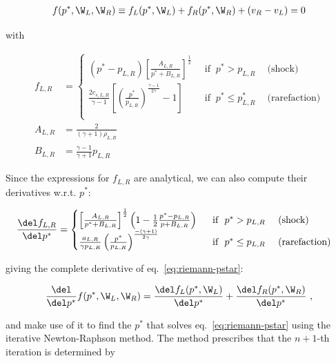 \begin{align}
	f(p^*, \W_L, \W_R) \equiv f_L(p^*, \W_L) + f_R(p^*, \W_R) + (v_R - v_L) = 0
\label{eq:riemann-pressure-equation}
\end{align}

with

\begin{align}
	f_{L,R} &=
		\begin{cases}
			(p^* - p_{L,R}) \left[ \frac{A_{L,R}}{p^* + B_{L,R}} \right]^{\frac{1}{2}}
				& ~\text{ if } ~ p^* > p_{L,R} ~ \quad \text{(shock)} \\
			\frac{2 c_{s,L,R}}{\gamma - 1} \left[ \left( \frac{p^*}{p_{L,R}} \right)^ \frac{\gamma
-1}{2 \gamma} - 1 \right]
				& ~\text{ if } ~ p^* \leq p^*_{L,R} ~ \quad \text{(rarefaction)}
\label{eq:riemann-pstar}\\
		\end{cases} \\
	A_{L,R} &=
		\frac{2}{(\gamma + 1) \rho_{L,R}}\\
	B_{L,R} &=
		\frac{\gamma - 1}{\gamma + 1} p_{L,R}
\end{align}


Since the expressions for $f_{L,R}$ are analytical, we can also compute their derivatives w.r.t.
$p^*$:

\begin{align}
	\frac{\del f_{L,R}}{\del p^*} &=
		\begin{cases}
			\left[
                \frac{A_{L,R}}{p^* + B_{L,R}}
            \right]^{\frac{1}{2}} \left( 1 - \frac{1}{2}
            \frac{p^* - p_{L,R}}{p + B_{L,R}} \right)
				& ~\text{ if } ~ p^* > p_{L,R} ~ \quad \text{(shock)} \\
			\frac{a_{L,R}}{\gamma p_{L,R}}
			\left( \frac{p^*}{p_{L,R}} \right)^ \frac{-(\gamma+1)}{2 \gamma}
				& ~\text{ if } ~ p^* \leq p_{L,R} ~ \quad \text{(rarefaction)}
\label{eq:riemann-pstar-dp}\\
		\end{cases}
\end{align}

giving the complete derivative of eq.~\ref{eq:riemann-pstar}:

\begin{align}
  \frac{\del}{\del p^*} f(p^*, \W_L, \W_R)= \frac{\del f_L(p^*, \W_L)}{\del p^*} + \frac{\del
f_{R}(p^*, \W_R)}{\del p^*} \ ,
\end{align}


and make use of it to find the $p^*$ that solves eq.~\ref{eq:riemann-pstar} using the iterative
Newton-Raphson method. The method prescribes that the $n + 1$-th iteration is determined by

